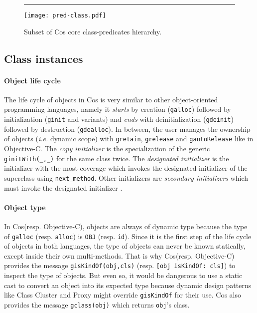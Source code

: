 \documentclass[preprint,10pt]{sigplanconf}
\newcommand{\abbrev}[1]{{\em #1}\xspace}
\newcommand{\ie}{\abbrev{i.e.}}
\newcommand{\ProgLang}[1]{{\sc #1}\xspace}
\newcommand{\Cos}       {\ProgLang{Cos}}
\newcommand{\Objc}      {\ProgLang{Objective-C}}
\newcommand{\hr}{\rule{\columnwidth}{0.33pt}}
\newcommand{\code}[1]{\lstinline[language=COS,style=samplecode]|#1|}
\newcommand{\objcode}[1]{\lstinline[language=OBJC,style=samplecode]|#1|}
\begin{document}
\begin{figure}\hr
\begin{center}
\vspace*{-2mm}
\texttt{[image: pred-class.pdf]}
\vspace*{-2mm}
\end{center}
\caption{Subset of \Cos core class-predicates hierarchy.\label{fig:predtree}}
\end{figure}

\subsection{Class instances\label{ssec:obj}}

\paragraph{Object life cycle}

The life cycle of objects in \Cos is very similar to other object-oriented programming languages, namely it {\em starts} by creation (\code{galloc}) followed by initialization (\code{ginit} and variants) and {\em ends} with deinitialization (\code{gdeinit}) followed by destruction (\code{gdealloc}). In between, the user manages the ownership of objects (\ie dynamic scope) with \code{gretain}, \code{grelease} and \code{gautoRelease} like in \Objc. The {\em copy initializer} is the specialization of the generic \code{ginitWith(_,_)} for the same class twice. The {\em designated initializer} is the initializer with the most coverage which invokes the designated initializer of the superclass using \code{next_method}. Other initializers are {\em secondary initializers} which must invoke the designated initializer \cite{cocoa07}.

\paragraph{Object type}

In \Cos (resp. \Objc), objects are always of dynamic type because the type of \code{galloc} (resp. \objcode{alloc}) is \code{OBJ} (resp. \objcode{id}). Since it is the first step of the life cycle of objects in both languages, the type of objects can never be known statically, except inside their own multi-methods. That is why \Cos (resp. \Objc) provides the message \code{gisKindOf(obj,cls)} (resp. \objcode{[obj isKindOf: cls]}) to inspect the type of objects. But even so, it would be dangerous to use a static cast to convert an object into its expected type because dynamic design patterns like Class Cluster and Proxy might override \code{gisKindOf} for their use. \Cos also provides the message \code{gclass(obj)} which returns \code{obj}'s class.
\end{document}
